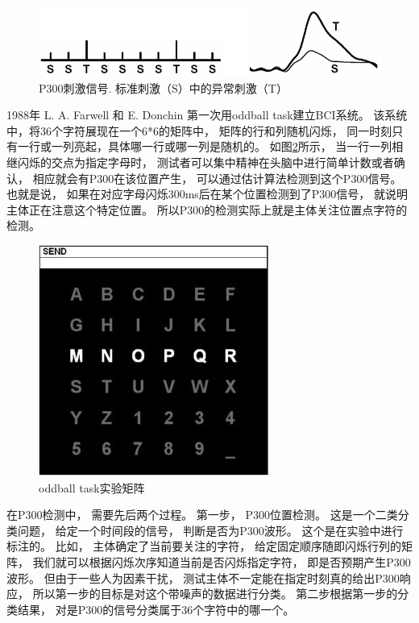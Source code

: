 \begin{figure}[htb]
\centering
\includegraphics[scale=0.6]{Pictures/Chap1/p300_example.png}
\caption{P300刺激信号. 标准刺激（S）中的异常刺激（T）\cite{polich2007updating}}
\label{Fig:P300_brief}
\end{figure}


1988年 L. A. Farwell 和 E. Donchin 第一次用oddball task建立BCI系统\cite{farwell1988talking}。 该系统中，将36个字符展现在一个6*6的矩阵中， 矩阵的行和列随机闪烁， 同一时刻只有一行或一列亮起，具体哪一行或哪一列是随机的。 如图\ref{Fig:p300matrix}所示， 当一行一列相继闪烁的交点为指定字母时， 测试者可以集中精神在头脑中进行简单计数或者确认， 相应就会有P300在该位置产生， 可以通过估计算法检测到这个P300信号。 也就是说， 如果在对应字母闪烁300ms后在某个位置检测到了P300信号， 就说明主体正在注意这个特定位置。 所以P300的检测实际上就是主体关注位置点字符的检测。  

\begin{figure}[htb]
\centering
\includegraphics[scale=0.8]{Pictures/Chap1/p300_matrix.jpg}
\caption{oddball task实验矩阵\cite{cecotti2011convolutional}}
\label{Fig:p300matrix}
\end{figure}

在P300检测中， 需要先后两个过程。 第一步， P300位置检测。 这是一个二类分类问题， 给定一个时间段的信号， 判断是否为P300波形。 这个是在实验中进行标注的。 比如， 主体确定了当前要关注的字符， 给定固定顺序随即闪烁行列的矩阵， 我们就可以根据闪烁次序知道当前是否闪烁指定字符， 即是否预期产生P300波形。 但由于一些人为因素干扰， 测试主体不一定能在指定时刻真的给出P300响应， 所以第一步的目标是对这个带噪声的数据进行分类。 第二步根据第一步的分类结果， 对是P300的信号分类属于36个字符中的哪一个。


